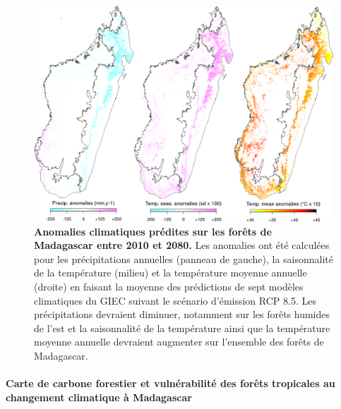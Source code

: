 \documentclass[12pt,]{article}
\let\oldparagraph\paragraph
\renewcommand{\paragraph}[1]{\oldparagraph{#1}\mbox{}}
\begin{document}
\begin{figure}[H]

{\centering \includegraphics[width=\textwidth]{figures/Anomalies} 

}

\caption{\textbf{Anomalies climatiques prédites sur les
forêts de Madagascar entre 2010 et 2080.} Les anomalies ont été
calculées pour les précipitations annuelles (panneau de gauche), la
saisonnalité de la température (milieu) et la température moyenne
annuelle (droite) en faisant la moyenne des prédictions de sept modèles
climatiques du GIEC suivant le scénario d'émission RCP 8.5. Les
précipitations devraient diminuer, notamment sur les forêts humides de
l'est et la saisonnalité de la température ainsi que la température
moyenne annuelle devraient augmenter sur l'ensemble des forêts de
Madagascar.}\label{fig:anomalies}
\end{figure}

\hypertarget{carte-de-carbone-forestier-et-vulnerabilite-des-forets-tropicales-au-changement-climatique-a-madagascar-1}{%
\paragraph{Carte de carbone forestier et vulnérabilité des forêts
tropicales au changement climatique à
Madagascar}\label{carte-de-carbone-forestier-et-vulnerabilite-des-forets-tropicales-au-changement-climatique-a-madagascar-1}}
\end{document}
